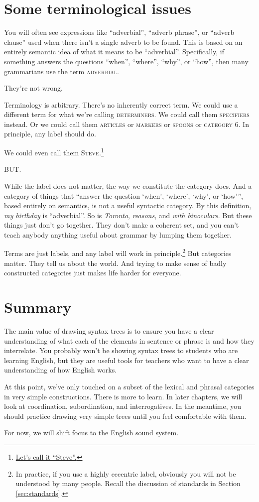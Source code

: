 \section{Some terminological issues} \label{sec:terminology}

You will often see expressions like ``adverbial'', ``adverb phrase'', or ``adverb clause'' used when there isn't a single adverb to be found. This is based on an entirely semantic idea of what it means to be ``adverbial''. Specifically, if something answers the questions ``when'', ``where'', ``why'', or ``how'', then many grammarians use the term \textsc{adverbial}.

They're not wrong.

Terminology is arbitrary. There's no inherently correct term. We could use a different term for what we're calling \textsc{determiners}. We could call them \textsc{specifiers} instead. Or we could call them \textsc{articles} or \textsc{markers} or \textsc{spoons} or \textsc{category 6}. In principle, any label should do.

We could even call them \textsc{Steve}.\footnote{\href{https://www.youtube.com/embed/CiGFRLCC-Ao}{Let's call it ``Steve''.}}

BUT.

While the label does not matter, the way we constitute the category does. And a category of things that ``answer the question `when', `where', `why', or `how''', based entirely on semantics, is not a useful syntactic category. By this definition, \textit{my birthday} is ``adverbial''. So is \textit{Toronto}, \textit{reasons}, and \textit{with binoculars}. But these things just don't go together. They don't make a coherent set, and you can't teach anybody anything useful about grammar by lumping them together.

Terms are just labels, and any label will work in principle.\footnote{In practice, if you use a highly eccentric label, obviously you will not be understood by many people. Recall the discussion of standards in Section \ref{sec:standards}.} But categories matter. They tell us about the world. And trying to make sense of badly constructed categories just makes life harder for everyone.

\section{Summary}
The main value of drawing syntax trees is to ensure you have a clear understanding of what each of the elements in sentence or phrase is and how they interrelate. You probably won't be showing syntax trees to students who are learning English, but they are useful tools for teachers who want to have a clear understanding of how English works.

At this point, we've only touched on a subset of the lexical and phrasal categories in very simple constructions. There is more to learn. In later chapters, we will look at coordination, subordination, and interrogatives. In the meantime, you should practice drawing very simple trees until you feel comfortable with them.

For now, we will shift focus to the English sound system.